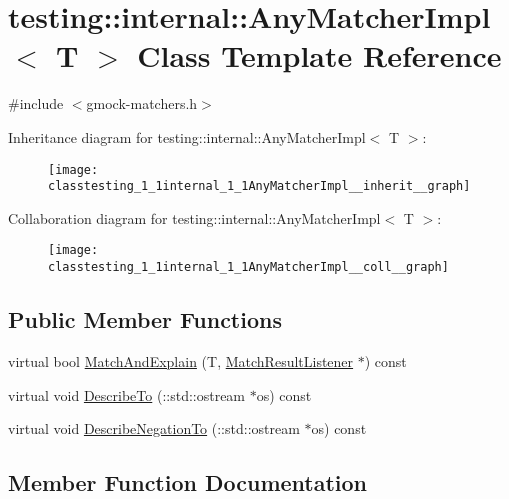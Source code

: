 \hypertarget{classtesting_1_1internal_1_1AnyMatcherImpl}{}\section{testing\+:\+:internal\+:\+:Any\+Matcher\+Impl$<$ T $>$ Class Template Reference}
\label{classtesting_1_1internal_1_1AnyMatcherImpl}


{\ttfamily \#include $<$gmock-\/matchers.\+h$>$}



Inheritance diagram for testing\+:\+:internal\+:\+:Any\+Matcher\+Impl$<$ T $>$\+:
\nopagebreak
\begin{figure}[H]
\begin{center}
\leavevmode
\texttt{[image: classtesting\_1\_1internal\_1\_1AnyMatcherImpl\_\_inherit\_\_graph]}
\end{center}
\end{figure}


Collaboration diagram for testing\+:\+:internal\+:\+:Any\+Matcher\+Impl$<$ T $>$\+:
\nopagebreak
\begin{figure}[H]
\begin{center}
\leavevmode
\texttt{[image: classtesting\_1\_1internal\_1\_1AnyMatcherImpl\_\_coll\_\_graph]}
\end{center}
\end{figure}
\subsection*{Public Member Functions}
\begin{DoxyCompactItemize}
\item 
virtual bool \hyperlink{classtesting_1_1internal_1_1AnyMatcherImpl_a03fe8956cfe9827b0ceacbd130fb88c1}{Match\+And\+Explain} (T, \hyperlink{classtesting_1_1MatchResultListener}{Match\+Result\+Listener} $\ast$) const 
\item 
virtual void \hyperlink{classtesting_1_1internal_1_1AnyMatcherImpl_ae68a082e0c85a0b6f3502698e60333a8}{Describe\+To} (\+::std\+::ostream $\ast$os) const 
\item 
virtual void \hyperlink{classtesting_1_1internal_1_1AnyMatcherImpl_ae403b0e2cf75db076e3465c579a2175b}{Describe\+Negation\+To} (\+::std\+::ostream $\ast$os) const 
\end{DoxyCompactItemize}


\subsection{Member Function Documentation}
